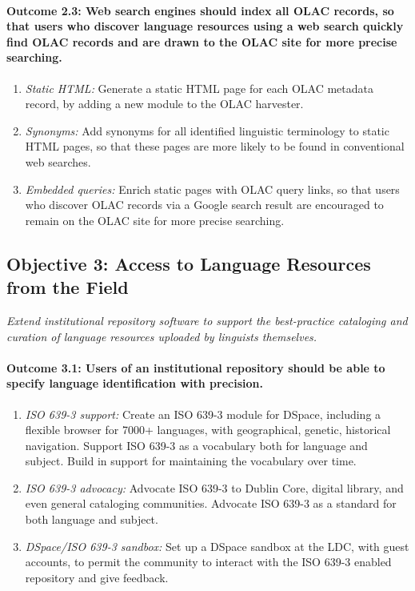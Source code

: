 
\def\task{2.3}
\paragraph{Outcome {\task}: Web search engines should index all OLAC records,
      so that users who discover language resources using a web search
      quickly find OLAC records and are drawn to the OLAC site for
      more precise searching.}

\begin{enumerate}[label=\emph{\task\alph*}]\setlength{\itemsep}{0pt}
\item \emph{Static HTML:}
  Generate a static HTML page for each OLAC metadata record, by adding
  a new module to the OLAC harvester.
\item \emph{Synonyms:}
  Add synonyms for all identified linguistic terminology to static HTML pages,
  so that these pages are more likely to be found in conventional web searches.
\item \emph{Embedded queries:}
  Enrich static pages with OLAC query links, so that users who discover
  OLAC records via a Google search result are encouraged to remain on the
  OLAC site for more precise searching.
\end{enumerate}

\subsection*{Objective 3: Access to Language Resources from the Field}

\emph{Extend institutional repository software to support the best-practice
    cataloging and curation of language resources 
    uploaded by linguists themselves.}

\def\task{3.1}
\paragraph{Outcome {\task}: Users of an institutional repository should be able
  to specify language identification with precision.}

\begin{enumerate}[label=\emph{\task\alph*}]\setlength{\itemsep}{0pt}
\item \emph{ISO 639-3 support:}
  Create an ISO 639-3 module for DSpace, including a flexible
  browser for 7000+ languages, with geographical, genetic, historical
  navigation. Support ISO 639-3 as a vocabulary both for language and subject.
  Build in support for maintaining the vocabulary over time.
\item \emph{ISO 639-3 advocacy:}
  Advocate ISO 639-3 to Dublin Core, digital library, and even general cataloging
  communities. Advocate ISO 639-3 as a standard for both language and subject.
\item \emph{DSpace/ISO 639-3 sandbox:}
  Set up a DSpace sandbox at the LDC, with guest accounts,
  to permit the community to interact with the
  ISO 639-3 enabled repository and give feedback.
\end{enumerate}

